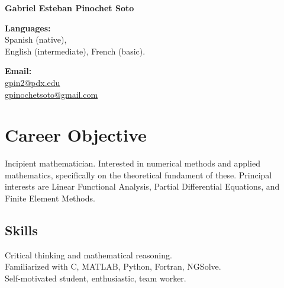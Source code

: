 \documentclass[12pt,letterpaper]{report}
\newcommand{\myname}{Gabriel Esteban Pinochet Soto}
\newcommand{\namefont}[1]{{\normalfont\bfseries\Huge{#1}}}
\begin{document}
    \raggedright{}

    \namefont{\myname}

    \vspace{1em}
    \begin{minipage}[t]{0.55\textwidth}
        {\bf Languages:}\\ Spanish (native), \\English (intermediate), French (basic). \\
    \end{minipage}
    \begin{minipage}[t]{0.4\textwidth}
        {\bf Email:}\\
        \href{mailto:gpin2@pdx.edu}{gpin2@pdx.edu}\\
        \href{mailto:gpinochetsoto@gmail.com}{gpinochetsoto@gmail.com}\\
    \end{minipage}


    \section*{Career Objective}

    Incipient mathematician.
    Interested in numerical methods and applied mathematics, specifically on the theoretical fundament of these.
    Principal interests are Linear Functional Analysis, Partial Differential Equations, and Finite Element Methods.

    \subsection*{Skills}

    Critical thinking and mathematical reasoning.\\
    Familiarized with C, MATLAB, Python, Fortran, NGSolve.\\
    Self-motivated student, enthusiastic, team worker.

\end{document}
